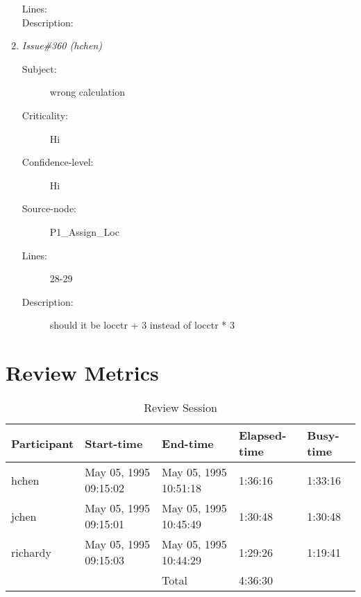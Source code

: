 \begin{enumerate}
\begin{description}
\item [Lines:] 

\item [Description:] 
\end{description}
\item {\it Issue\#360 (hchen)}
\begin{description}
\item [Subject:] wrong calculation
\item [Criticality:] Hi
\item [Confidence-level:] Hi
\item [Source-node:] P1\_Assign\_Loc

\item [Lines:] 28-29

\item [Description:] should it be locctr + 3 instead of locctr * 3
\end{description}
\end{enumerate}
\section{Review Metrics}
\begin{table}[hb]
\begin{center}
\begin{tabular}{|l|l|l|l|l|}
\hline
Participant & Start-time & End-time & Elapsed-time & Busy-time \\
\hline
hchen & May 05, 1995 09:15:02 & May 05, 1995 10:51:18 & 1:36:16 & 1:33:16 \\
jchen & May 05, 1995 09:15:01 & May 05, 1995 10:45:49 & 1:30:48 & 1:30:48 \\
richardy & May 05, 1995 09:15:03 & May 05, 1995 10:44:29 & 1:29:26 & 1:19:41 \\
\hline
 & & Total & 4:36:30 & \\
\hline
\end{tabular}
\end{center}
\caption{Review Session}
\end{table}


